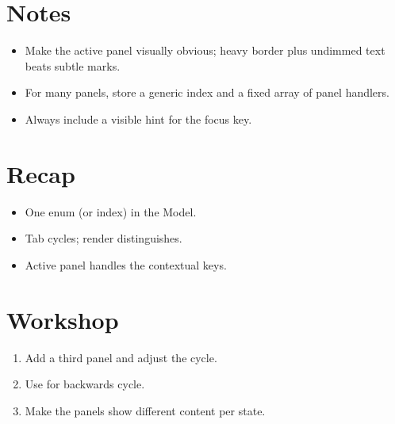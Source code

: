 \section{Notes}

\begin{itemize}[leftmargin=*]
  \item Make the active panel visually obvious; heavy border
    plus undimmed text beats subtle marks.
  \item For many panels, store a generic index and a fixed
    array of panel handlers.
  \item Always include a visible hint for the focus key.
\end{itemize}

\section{Recap}

\begin{recap}
\begin{itemize}[leftmargin=*]
  \item One enum (or index) in the Model.
  \item Tab cycles; render distinguishes.
  \item Active panel handles the contextual keys.
\end{itemize}
\end{recap}

\section*{Workshop}

\begin{enumerate}[leftmargin=*]
  \item Add a third panel and adjust the cycle.
  \item Use  for backwards cycle.
  \item Make the panels show different content per state.
\end{enumerate}

